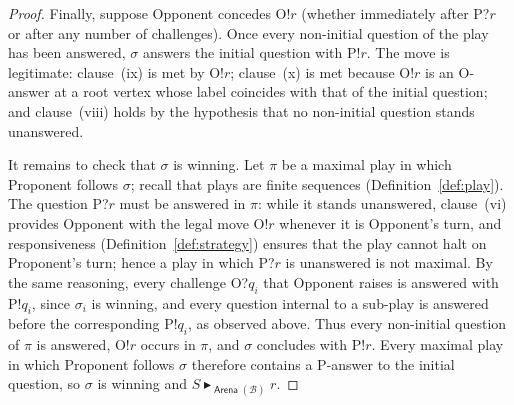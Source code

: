 \documentclass[10pt,a4paper]{amsart}
\newcommand{\base}[1]{\mathcal{#1}}                    %
\newcommand{\toarena}[1]{\mathrel{\textsf{Arena}}(#1)}           %
\newcommand{\wstrat}[1]{\blacktriangleright_{#1}}            %
\begin{document}
\begin{proof}
Finally, suppose Opponent concedes O!$r$ (whether immediately after P?$r$ or
after any number of challenges). Once every non-initial question of the play
has been answered, $\sigma$ answers the initial question with P!$r$. The move
is legitimate: clause~(ix) is met by O!$r$; clause~(x) is met because O!$r$
is an O-answer at a root vertex whose label coincides with that of the
initial question; and clause~(viii) holds by the hypothesis that no
non-initial question stands unanswered.
 
It remains to check that $\sigma$ is winning. Let $\pi$ be a maximal play in
which Proponent follows $\sigma$; recall that plays are finite sequences
(Definition~\ref{def:play}). The question P?$r$ must be answered in $\pi$:
while it stands unanswered, clause~(vi) provides Opponent with the legal move
O!$r$ whenever it is Opponent's turn, and responsiveness
(Definition~\ref{def:strategy}) ensures that the play cannot halt on
Proponent's turn; hence a play in which P?$r$ is unanswered is not maximal.
By the same reasoning, every challenge O?$q_i$ that Opponent raises is
answered with P!$q_i$, since $\sigma_i$ is winning, and every question
internal to a sub-play is answered before the corresponding P!$q_i$, as
observed above. Thus every non-initial question of $\pi$ is answered, O!$r$
occurs in $\pi$, and $\sigma$ concludes with P!$r$. Every maximal play in
which Proponent follows $\sigma$ therefore contains a P-answer to the initial
question, so $\sigma$ is winning and $S \wstrat{\toarena{\base{B}}} r$.
\end{proof}
\end{document}
